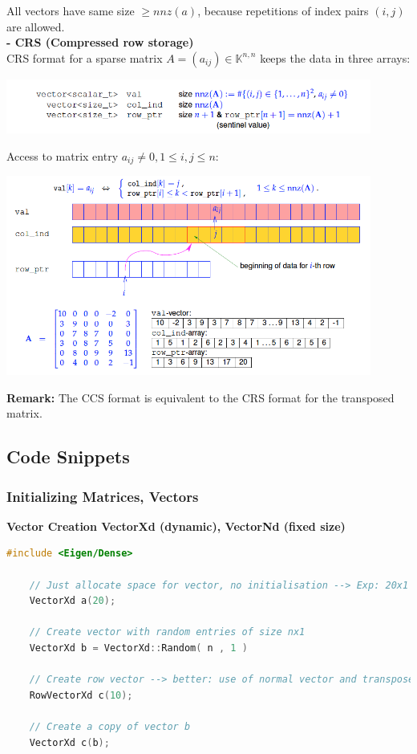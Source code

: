 \documentclass[12pt, a4paper]{article}
\newcommand{\K}{\mathbb{K}}
\begin{document}
All vectors have same size $\geq nnz(a)$, because repetitions of index pairs $(i,j)$ are allowed. \\

\textbf{- CRS (Compressed row storage)} \\
CRS format for a sparse matrix $A = (a_{ij}) \in \K^{n,n}$ keeps the data in three arrays:
\begin{center}
	\includegraphics[width=0.9\textwidth]{SparseMatrix_CRS_structure.png}
\end{center}

Access to matrix entry $a_{ij} \not = 0,1 \leq i,j \leq n$:

\begin{center}
	\includegraphics[width=0.9\textwidth]{SparseMatrix_CRS.png}
\end{center}

\textbf{Remark:} The CCS format is equivalent to the CRS format for the transposed matrix. \\



\subsection{Code Snippets}

\subsubsection{Initializing Matrices, Vectors}

\textbf{Vector Creation \hspace{32mm} \color{blue}VectorXd (dynamic), VectorNd (fixed size)} \color{black}
\begin{lstlisting}[language=C++]
	#include <Eigen/Dense>

	// Just allocate space for vector, no initialisation --> Exp: 20x1 vector
	VectorXd a(20);
	
	// Create vector with random entries of size nx1
	VectorXd b = VectorXd::Random( n , 1 )
	
	// Create row vector --> better: use of normal vector and transpose
	RowVectorXd c(10);
	
	// Create a copy of vector b
	VectorXd c(b);
\end{lstlisting}
\end{document}
